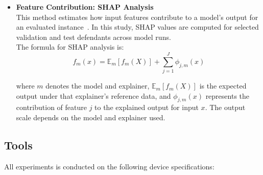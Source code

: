 \documentclass[12pt]{article}
\begin{document}
\begin{itemize}
  For the current adviser-review implementation, MRIP is computed for the first validation defendant in each fold across every run in that fold, and for the first test defendant across every run and fold, for each configured classifier: Logistic Regression, LinearSVC, XGBoost, Random Forest, and MLP.\@ The held-out test set is the fixed labeled reference set for both calculations; the test defendant being evaluated is excluded from that reference set. The selected models were not fitted on the test reference examples, and neither evaluated defendant's own outcome is used in its MRIP calculation. Separate result files are saved for each classifier. Each row represents one evaluated defendant in one fold and includes the defendant ID, fold number, one MRIP column per bootstrap run (dataset instability) or random seed (stochastic instability), and a final Mean MRIP column. Mean MRIP is calculated across runs within that fold, including for the fixed test defendant; test-defendant means are not pooled across folds.

  \item \textbf{Feature Contribution: SHAP Analysis} \\
  \tabto{2em} This method estimates how input features contribute to a model's output for an evaluated instance~\cite{ponce2024practical}. In this study, SHAP values are computed for selected validation and test defendants across model runs.\\

  The formula for SHAP analysis is:
  \[ f_m(x) = \mathbb{E}_{m}[f_m(X)] + \sum_{j=1}^{J} \phi_{j,m}(x) \]

  where $m$ denotes the model and explainer, $ \mathbb{E}_{m}[f_m(X)] $ is the expected output under that explainer's reference data, and $ \phi_{j,m}(x) $ represents the contribution of feature $ j $ to the explained output for input $ x $. The output scale depends on the model and explainer used.
\end{itemize}

\subsection{Tools} 
All experiments is conducted on the following device specifications:
\end{document}
